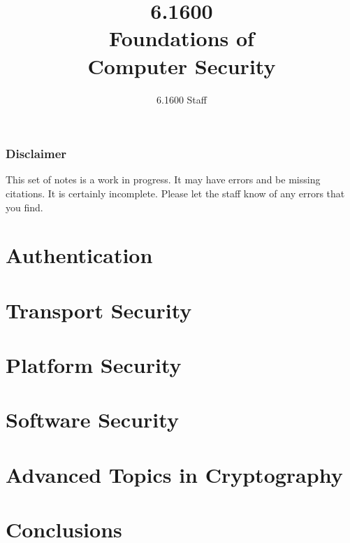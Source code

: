 \documentclass[
letterpaper, %
oneside,
nobib
]{tufte-book}
\author{6.1600 Staff}
\title{6.1600\\Foundations of\\Computer Security}
\begin{document}
\mainmatter

\maketitle

\section{Disclaimer}
This set of notes is a work in progress. It may have errors and be missing citations. It is certainly incomplete. Please let the staff know of any errors that you find.

\clearpage

\tableofcontents*
\clearpage





\part{Authentication}







\part{Transport Security}





 


\part{Platform Security} 






\part{Software Security}

 
% 


\part{Advanced Topics in Cryptography}



\part{Conclusions}


\backmatter

\printbibliography
\end{document}
